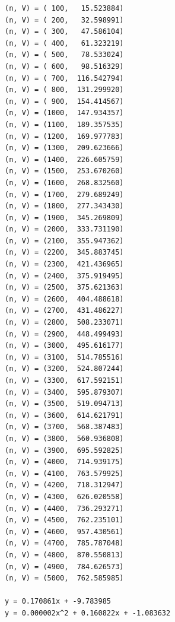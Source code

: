 \documentclass[a4j,titlepage]{jsarticle}
\begin{document}
\begin{lstlisting}[style=text,caption=pが0.5のときの実行結果,label=lst:kekka14-1]
(n, V) = ( 100,   15.523884)
(n, V) = ( 200,   32.598991)
(n, V) = ( 300,   47.586104)
(n, V) = ( 400,   61.323219)
(n, V) = ( 500,   78.533024)
(n, V) = ( 600,   98.516329)
(n, V) = ( 700,  116.542794)
(n, V) = ( 800,  131.299920)
(n, V) = ( 900,  154.414567)
(n, V) = (1000,  147.934357)
(n, V) = (1100,  189.357535)
(n, V) = (1200,  169.977783)
(n, V) = (1300,  209.623666)
(n, V) = (1400,  226.605759)
(n, V) = (1500,  253.670260)
(n, V) = (1600,  268.832560)
(n, V) = (1700,  279.689249)
(n, V) = (1800,  277.343430)
(n, V) = (1900,  345.269809)
(n, V) = (2000,  333.731190)
(n, V) = (2100,  355.947362)
(n, V) = (2200,  345.883745)
(n, V) = (2300,  421.436965)
(n, V) = (2400,  375.919495)
(n, V) = (2500,  375.621363)
(n, V) = (2600,  404.488618)
(n, V) = (2700,  431.486227)
(n, V) = (2800,  508.233071)
(n, V) = (2900,  448.499493)
(n, V) = (3000,  495.616177)
(n, V) = (3100,  514.785516)
(n, V) = (3200,  524.807244)
(n, V) = (3300,  617.592151)
(n, V) = (3400,  595.879307)
(n, V) = (3500,  519.094713)
(n, V) = (3600,  614.621791)
(n, V) = (3700,  568.387483)
(n, V) = (3800,  560.936808)
(n, V) = (3900,  695.592825)
(n, V) = (4000,  714.939175)
(n, V) = (4100,  763.579925)
(n, V) = (4200,  718.312947)
(n, V) = (4300,  626.020558)
(n, V) = (4400,  736.293271)
(n, V) = (4500,  762.235101)
(n, V) = (4600,  957.430561)
(n, V) = (4700,  785.787048)
(n, V) = (4800,  870.550813)
(n, V) = (4900,  784.626573)
(n, V) = (5000,  762.585985)

y = 0.170861x + -9.783985
y = 0.000002x^2 + 0.160822x + -1.083632
\end{lstlisting}
\end{document}
